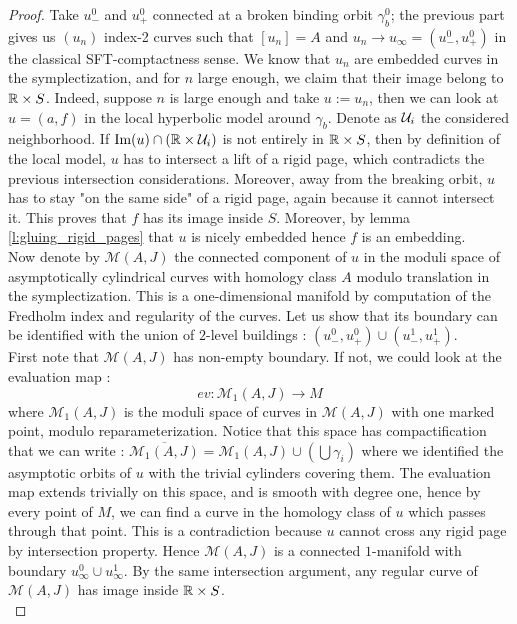 \documentclass[../main.tex]{subfiles}
\begin{document}
\begin{proof}
Take $u_-^0$ and $u_+^0$ connected at a broken binding orbit $\gamma_b^0$; the previous part gives us $(u_n)$ index-2 curves such that $[u_n] = A$ and $u_n\rightarrow u_\infty = (u_-^0,u_+^0)$ in the classical SFT-comptactness sense. We know that $u_n$ are embedded curves in the symplectization, and for $n$ large enough, we claim that their image belong to $\mathbb{R}\times S$. Indeed, suppose $n$ is large enough and take $u := u_n$, then we can look at $u  = (a,f)$ in the local hyperbolic model around $\gamma_b$. Denote as $\mathcal{U}_i$ the considered neighborhood. If $\text{Im}(u)\cap (\mathbb{R}\times \mathcal{U}_i) $ is not entirely in $\mathbb{R}\times S$, then by definition of the local model, $u$ has to intersect a lift of a rigid page, which contradicts the previous intersection considerations. Moreover, away from the breaking orbit, $u$ has to stay "on the same side" of a rigid page, again because it cannot intersect it. This proves that $f$ has its image inside $S$. Moreover, by lemma \ref{l:gluing_rigid_pages} that $u$ is nicely embedded hence $f$ is an embedding.\\

Now denote by $\mathcal{M}(A,J)$ the connected component of $u$ in the moduli space of asymptotically cylindrical curves with homology class $A$ modulo translation in the symplectization. This is a one-dimensional manifold by computation of the Fredholm index and regularity of the curves. Let us show that its boundary can be identified with the union of $2$-level buildings : $(u_-^0,u_+^0)\cup(u_-^1,u_+^1)$.\\ 

First note that $\mathcal{M}(A,J)$ has non-empty boundary. If not, we could look at the evaluation map : $$ev : \mathcal{M}_1(A,J)\rightarrow M$$ where $\mathcal{M}_1(A,J)$ is the moduli space of curves in $\mathcal{M}(A,J)$ with one marked point, modulo reparameterization. Notice that this space has compactification that we can write : $\overline{\mathcal{M}_1(A,J)} = \mathcal{M}_1(A,J)\cup (\bigcup\gamma_i)$ where we identified the asymptotic orbits of $u$ with the trivial cylinders covering them. The evaluation map extends trivially on this space, and is smooth with degree one, hence by every point of $M$, we can find a curve in the homology class of $u$ which passes through that point. This is a contradiction because $u$ cannot cross any rigid page by intersection property. Hence $\mathcal{M}(A,J)$ is a connected $1$-manifold with boundary $u_\infty^0\cup u^1_\infty$. By the same intersection argument, any regular curve of $\mathcal{M}(A,J)$ has image inside $\mathbb{R}\times S$.\\


\end{proof}
\end{document}
